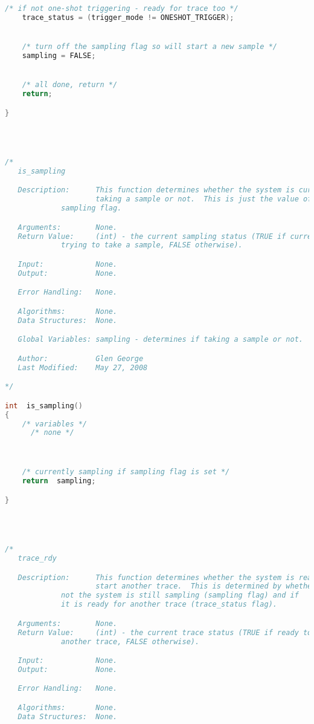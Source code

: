 \begin{lstlisting}[language=C]
    /* if not one-shot triggering - ready for trace too */
    trace_status = (trigger_mode != ONESHOT_TRIGGER);


    /* turn off the sampling flag so will start a new sample */
    sampling = FALSE;


    /* all done, return */
    return;

}




/*
   is_sampling

   Description:      This function determines whether the system is currently
                     taking a sample or not.  This is just the value of the
		     sampling flag.

   Arguments:        None.
   Return Value:     (int) - the current sampling status (TRUE if currently
   		     trying to take a sample, FALSE otherwise).

   Input:            None.
   Output:           None.

   Error Handling:   None.

   Algorithms:       None.
   Data Structures:  None.

   Global Variables: sampling - determines if taking a sample or not.

   Author:           Glen George
   Last Modified:    May 27, 2008

*/

int  is_sampling()
{
    /* variables */
      /* none */



    /* currently sampling if sampling flag is set */
    return  sampling;

}




/*
   trace_rdy

   Description:      This function determines whether the system is ready to
                     start another trace.  This is determined by whether or
		     not the system is still sampling (sampling flag) and if
		     it is ready for another trace (trace_status flag).

   Arguments:        None.
   Return Value:     (int) - the current trace status (TRUE if ready to do
   		     another trace, FALSE otherwise).

   Input:            None.
   Output:           None.

   Error Handling:   None.

   Algorithms:       None.
   Data Structures:  None.


\end{lstlisting}
